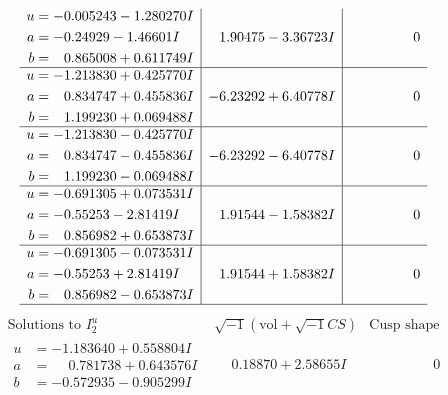 \documentclass[1p]{elsarticle_modified}
\theoremstyle{definition}
\newcommand{\I}{\sqrt{-1}}
\begin{document}
$$\begin{array}{c|c|c}
\begin{aligned}
u &= -0.005243 - 1.280270 I \\
a &= -0.24929 - 1.46601 I \\
b &= \phantom{-}0.865008 + 0.611749 I\end{aligned}
 & \phantom{-}1.90475 - 3.36723 I & \phantom{-0.000000 } 0 \\ \hline\begin{aligned}
u &= -1.213830 + 0.425770 I \\
a &= \phantom{-}0.834747 + 0.455836 I \\
b &= \phantom{-}1.199230 + 0.069488 I\end{aligned}
 & -6.23292 + 6.40778 I & \phantom{-0.000000 } 0 \\ \hline\begin{aligned}
u &= -1.213830 - 0.425770 I \\
a &= \phantom{-}0.834747 - 0.455836 I \\
b &= \phantom{-}1.199230 - 0.069488 I\end{aligned}
 & -6.23292 - 6.40778 I & \phantom{-0.000000 } 0 \\ \hline\begin{aligned}
u &= -0.691305 + 0.073531 I \\
a &= -0.55253 - 2.81419 I \\
b &= \phantom{-}0.856982 + 0.653873 I\end{aligned}
 & \phantom{-}1.91544 - 1.58382 I & \phantom{-0.000000 } 0 \\ \hline\begin{aligned}
u &= -0.691305 - 0.073531 I \\
a &= -0.55253 + 2.81419 I \\
b &= \phantom{-}0.856982 - 0.653873 I\end{aligned}
 & \phantom{-}1.91544 + 1.58382 I & \phantom{-0.000000 } 0\\
 \hline 
 \end{array}$$\newpage$$\begin{array}{c|c|c}  
\text{Solutions to }I^u_{2}& \I (\text{vol} + \sqrt{-1}CS) & \text{Cusp shape}\\
 \hline 
\begin{aligned}
u &= -1.183640 + 0.558804 I \\
a &= \phantom{-}0.781738 + 0.643576 I \\
b &= -0.572935 - 0.905299 I\end{aligned}
 & \phantom{-}0.18870 + 2.58655 I & \phantom{-0.000000 } 0 \\ \hline\begin{aligned}

\end{aligned}
\end{array}$$
\end{document}
